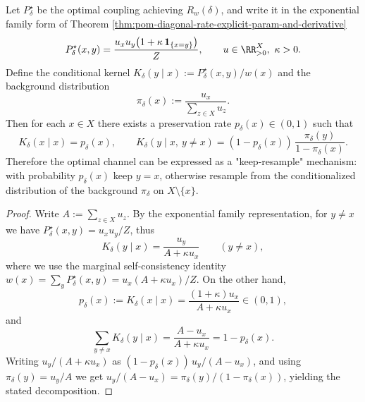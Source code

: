 
\begin{proposition}\label{prop:pom-diagonal-rate-keep-resample-channel}
Let \(P^\star_\delta\) be the optimal coupling achieving \(R_w(\delta)\), and write it in the exponential family form of Theorem \ref{thm:pom-diagonal-rate-explicit-param-and-derivative}
\[
P^\star_\delta(x,y)=\frac{u_xu_y\bigl(1+\kappa\,\mathbf 1_{\{x=y\}}\bigr)}{Z},
\qquad
u\in\RR_{>0}^X,\ \kappa>0.
\]
Define the conditional kernel \(K_\delta(y\mid x):=P^\star_\delta(x,y)/w(x)\) and the background distribution
\[
\pi_\delta(x):=\frac{u_x}{\sum_{z\in X}u_z}.
\]
Then for each \(x\in X\) there exists a preservation rate \(p_\delta(x)\in(0,1)\) such that
\[
K_\delta(x\mid x)=p_\delta(x),\qquad
K_\delta(y\mid x,\ y\ne x)=(1-p_\delta(x))\,\frac{\pi_\delta(y)}{1-\pi_\delta(x)}.
\]
Therefore the optimal channel can be expressed as a "keep-resample" mechanism: with probability \(p_\delta(x)\) keep \(y=x\), otherwise resample from the conditionalized distribution of the background \(\pi_\delta\) on \(X\setminus\{x\}\).
\end{proposition}
\begin{proof}
Write \(A:=\sum_{z\in X}u_z\).
By the exponential family representation, for \(y\ne x\) we have \(P^\star_\delta(x,y)=u_xu_y/Z\), thus
\[
K_\delta(y\mid x)=\frac{u_y}{A+\kappa u_x}\qquad(y\ne x),
\]
where we use the marginal self-consistency identity \(w(x)=\sum_y P^\star_\delta(x,y)=u_x(A+\kappa u_x)/Z\).
On the other hand,
\[
p_\delta(x):=K_\delta(x\mid x)
=\frac{(1+\kappa)u_x}{A+\kappa u_x}\in(0,1),
\]
and
\[
\sum_{y\ne x}K_\delta(y\mid x)=\frac{A-u_x}{A+\kappa u_x}=1-p_\delta(x).
\]
Writing \(u_y/(A+\kappa u_x)\) as \((1-p_\delta(x))\,u_y/(A-u_x)\), and using \(\pi_\delta(y)=u_y/A\) we get
\(
u_y/(A-u_x)=\pi_\delta(y)/(1-\pi_\delta(x))
\),
yielding the stated decomposition.
\end{proof}
